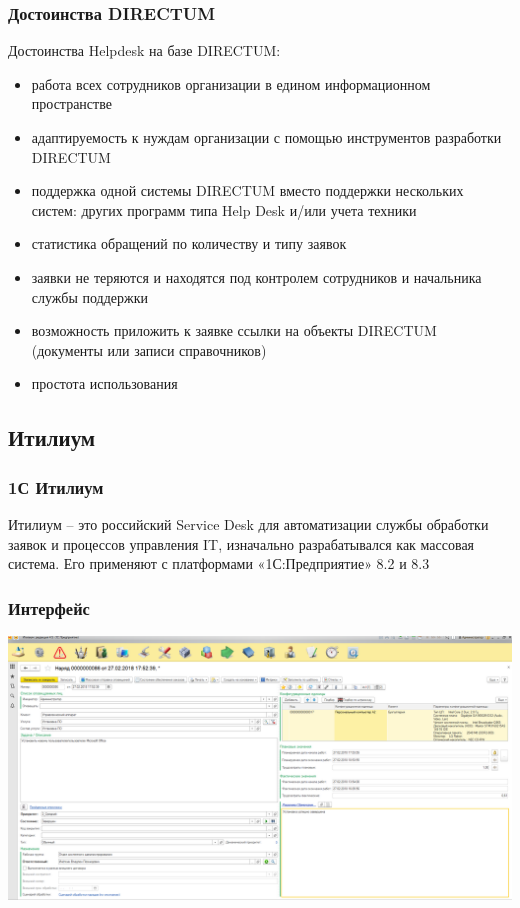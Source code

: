 \documentclass{../industrial-development}
\begin{document}
\begin{frame} \frametitle{Достоинства DIRECTUM}
Достоинства Helpdesk на базе DIRECTUM:
	\begin{itemize}
		\item работа всех сотрудников организации в едином информационном пространстве
		\item адаптируемость к нуждам организации с помощью инструментов разработки DIRECTUM
		\item поддержка одной системы DIRECTUM вместо поддержки нескольких систем: других программ типа Help Desk и/или учета техники
		\item статистика обращений по количеству и типу заявок
		\item заявки не теряются и находятся под контролем сотрудников и начальника службы поддержки
		\item возможность приложить к заявке ссылки на объекты DIRECTUM (документы или записи справочников)
		\item простота использования
	\end{itemize}
\end{frame}
\lecturenotes

\subsection{Итилиум}
\begin{frame} \frametitle{1С Итилиум}

    Итилиум -- это российский Service Desk для автоматизации службы обработки заявок и процессов управления IT, изначально разрабатывался как массовая система. Его применяют с платформами «1С:Предприятие» 8.2 и 8.3

\end{frame}
\lecturenotes

\begin{frame} \frametitle{Интерфейс}
\centerline{\includegraphics[width=\textwidth]{pic10.png}}
\end{frame}
\lecturenotes
\end{document}
